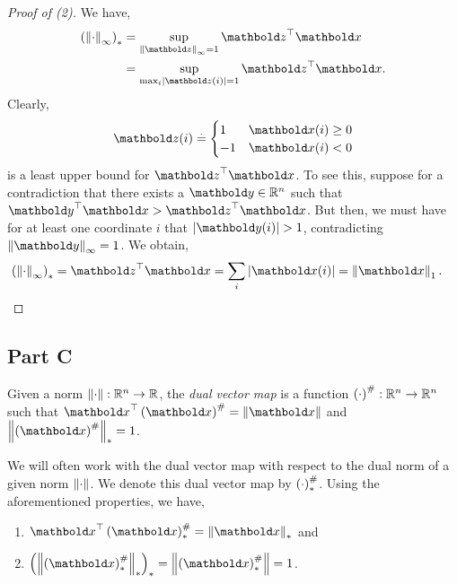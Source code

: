 \documentclass{tufte-handout}
\begin{document}
\begin{proof}[Proof of (2)] We have, \begin{align*}
    \parentheses*{\norm{\cdot}_\infty}_* &= \sup_{\norm{\vz}_\infty=1} \trans{\vz}\vx \\
    &= \sup_{\max_i \abs{\vz(i)} = 1} \trans{\vz}\vx.
\end{align*} Clearly, \begin{align*}
    \vz(i) \defeq \begin{cases}
        1 & \vx(i) \geq 0 \\
        -1 & \vx(i) < 0
    \end{cases}
\end{align*} is a least upper bound for $\trans{\vz}\vx$. To see this, suppose for a contradiction that there exists a $\vy \in \R^n$ such that $\trans{\vy}\vx > \trans{\vz}\vx$. But then, we must have for at least one coordinate $i$ that $\abs{\vy(i)} > 1$, contradicting $\norm{\vy}_\infty = 1$. We obtain, \begin{align*}
    \parentheses*{\norm{\cdot}_\infty}_* &= \trans{\vz}\vx = \sum_i \abs{\vx(i)} = \norm{\vx}_1. \qedhere
\end{align*}
\end{proof}

\subsection{Part C}
\begin{defn}
Given a norm $\left\| \cdot \right\| : \mathbb{R}^n \to \mathbb{R}$, the \emph{dual vector map} is a function $\left( \cdot \right)^\# : \mathbb{R}^n \to \mathbb{R}^n$ such that $\trans{\vx}\dvm{\vx} = \norm{\vx}$ and $\norm{\dvm{\vx}}_* = 1$.
\end{defn}

We will often work with the dual vector map with respect to the dual norm of a given norm $\left\| \cdot \right\|$. We denote this dual vector map by $\left( \cdot \right)^\#_*$. Using the aforementioned properties, we have, \begin{enumerate}
    \item $\trans{\vx}\dvm{\vx}_* = \norm{\vx}_*$ and
    \item $\parentheses*{\norm{\dvm{\vx}_*}_*}_* = \norm{\dvm{\vx}_*} = 1$. 
\end{enumerate}
\end{document}
